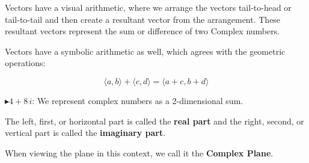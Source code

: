 \documentclass{ximera}
\begin{document}
\begin{image}
\end{image}

Vectors have a visual arithmetic, where we arrange the vectors tail-to-head or tail-to-tail and then create a resultant vector from the arrangement. These resultant vectors represent the sum or difference of two Complex numbers.

Vectors have a symbolic arithmetic as well, which agrees with the geometric operations:

\[
\langle a, b \rangle + \langle c, d \rangle = \langle a+c, b+d \rangle
\]



\textbf{\textcolor{red!70!darkgray}{$\blacktriangleright 4 + 8 \, i$}}: We represent complex numbers as a 2-dimensional sum.



The left, first, or horizontal part is called the \textbf{\textcolor{purple!85!blue}{real part}} and the right, second, or vertical part is called the \textbf{\textcolor{purple!85!blue}{imaginary part}}.



When viewing the plane in this context, we call it the \textbf{\textcolor{purple!85!blue}{Complex Plane}}.
\end{document}
